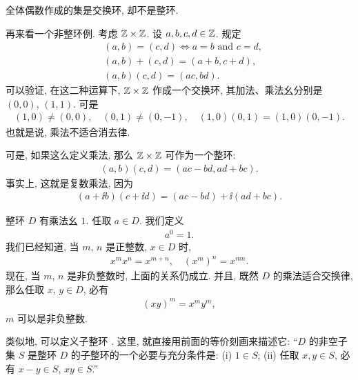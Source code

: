 \begin{example}
    全体偶数作成的集是交换环, 却不是整环.
\end{example}

\begin{example}
    再来看一个非整环例. 考虑 $\mathbb{Z} \times \mathbb{Z}$. 设 $a,b,c,d \in \mathbb{Z}$. 规定
    \begin{align*}
         & (a,b) = (c,d) \iff a = b \text{ and } c = d, \\
         & (a,b) + (c,d) = (a+b,c+d),                   \\
         & (a,b)(c,d) = (ac,bd).
    \end{align*}
    可以验证, 在这二种运算下, $\mathbb{Z} \times \mathbb{Z}$ 作成一个交换环, 其加法、乘法幺分别是 $(0,0)$, $(1,1)$. 可是
    \begin{align*}
        (1,0) \neq (0,0), \quad (0,1) \neq (0,-1), \quad (1,0)(0,1) = (1,0)(0,-1).
    \end{align*}
    也就是说, 乘法不适合消去律.
\end{example}

\begin{remark}
    可是, 如果这么定义乘法, 那么 $\mathbb{Z} \times \mathbb{Z}$ 可作为一个整环:
    \begin{align*}
        (a,b)(c,d) = (ac-bd,ad+bc).
    \end{align*}
    事实上, 这就是复数乘法, 因为
    \begin{align*}
        (a+ \ii b)(c+ \ii d) = (ac-bd) + \ii (ad+bc).
    \end{align*}
\end{remark}

\begin{remark}
    整环 $D$ 有乘法幺 $1$. 任取 $a \in D$. 我们定义
    \begin{align*}
        a^0 = 1.
    \end{align*}
    我们已经知道, 当 $m$, $n$ 是正整数, $x \in D$ 时,
    \begin{align*}
        x^m x^n = x^{m+n}, \quad (x^m)^n = x^{mn}.
    \end{align*}
    现在, 当 $m$, $n$ 是非负整数时, 上面的关系仍成立. 并且, 既然 $D$ 的乘法适合交换律, 那么任取 $x$, $y \in D$, 必有
    \begin{align*}
        (xy)^m = x^m y^m,
    \end{align*}
    $m$ 可以是非负整数.
\end{remark}

\begin{remark}
    类似地, 可以定义子整环 . 这里, 就直接用前面的等价刻画来描述它: ``$D$ 的非空子集 $S$ 是整环 $D$ 的子整环的一个必要与充分条件是: (i) $1 \in S$; (ii) 任取 $x,y \in S$, 必有 $x-y \in S$, $xy \in S$.''
\end{remark}

